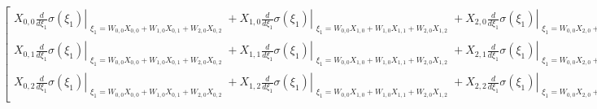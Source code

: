 \documentclass[11pt]{article}
\newcommand{\prompt}[4]{
        \ttfamily\llap{{\color{#2}[#3]:\hspace{3pt}#4}}\vspace{-\baselineskip}
    }
\begin{document}
\prompt{Out}{outcolor}{87}{}

    $\displaystyle \left[\begin{matrix}X_{0, 0} \left. \frac{d}{d \xi_{1}} \sigma{\left(\xi_{1} \right)} \right|_{\substack{ \xi_{1}=W_{0, 0} X_{0, 0} + W_{1, 0} X_{0, 1} + W_{2, 0} X_{0, 2} }} + X_{1, 0} \left. \frac{d}{d \xi_{1}} \sigma{\left(\xi_{1} \right)} \right|_{\substack{ \xi_{1}=W_{0, 0} X_{1, 0} + W_{1, 0} X_{1, 1} + W_{2, 0} X_{1, 2} }} + X_{2, 0} \left. \frac{d}{d \xi_{1}} \sigma{\left(\xi_{1} \right)} \right|_{\substack{ \xi_{1}=W_{0, 0} X_{2, 0} + W_{1, 0} X_{2, 1} + W_{2, 0} X_{2, 2} }} & X_{0, 0} \left. \frac{d}{d \xi_{1}} \sigma{\left(\xi_{1} \right)} \right|_{\substack{ \xi_{1}=W_{0, 1} X_{0, 0} + W_{1, 1} X_{0, 1} + W_{2, 1} X_{0, 2} }} + X_{1, 0} \left. \frac{d}{d \xi_{1}} \sigma{\left(\xi_{1} \right)} \right|_{\substack{ \xi_{1}=W_{0, 1} X_{1, 0} + W_{1, 1} X_{1, 1} + W_{2, 1} X_{1, 2} }} + X_{2, 0} \left. \frac{d}{d \xi_{1}} \sigma{\left(\xi_{1} \right)} \right|_{\substack{ \xi_{1}=W_{0, 1} X_{2, 0} + W_{1, 1} X_{2, 1} + W_{2, 1} X_{2, 2} }}\\X_{0, 1} \left. \frac{d}{d \xi_{1}} \sigma{\left(\xi_{1} \right)} \right|_{\substack{ \xi_{1}=W_{0, 0} X_{0, 0} + W_{1, 0} X_{0, 1} + W_{2, 0} X_{0, 2} }} + X_{1, 1} \left. \frac{d}{d \xi_{1}} \sigma{\left(\xi_{1} \right)} \right|_{\substack{ \xi_{1}=W_{0, 0} X_{1, 0} + W_{1, 0} X_{1, 1} + W_{2, 0} X_{1, 2} }} + X_{2, 1} \left. \frac{d}{d \xi_{1}} \sigma{\left(\xi_{1} \right)} \right|_{\substack{ \xi_{1}=W_{0, 0} X_{2, 0} + W_{1, 0} X_{2, 1} + W_{2, 0} X_{2, 2} }} & X_{0, 1} \left. \frac{d}{d \xi_{1}} \sigma{\left(\xi_{1} \right)} \right|_{\substack{ \xi_{1}=W_{0, 1} X_{0, 0} + W_{1, 1} X_{0, 1} + W_{2, 1} X_{0, 2} }} + X_{1, 1} \left. \frac{d}{d \xi_{1}} \sigma{\left(\xi_{1} \right)} \right|_{\substack{ \xi_{1}=W_{0, 1} X_{1, 0} + W_{1, 1} X_{1, 1} + W_{2, 1} X_{1, 2} }} + X_{2, 1} \left. \frac{d}{d \xi_{1}} \sigma{\left(\xi_{1} \right)} \right|_{\substack{ \xi_{1}=W_{0, 1} X_{2, 0} + W_{1, 1} X_{2, 1} + W_{2, 1} X_{2, 2} }}\\X_{0, 2} \left. \frac{d}{d \xi_{1}} \sigma{\left(\xi_{1} \right)} \right|_{\substack{ \xi_{1}=W_{0, 0} X_{0, 0} + W_{1, 0} X_{0, 1} + W_{2, 0} X_{0, 2} }} + X_{1, 2} \left. \frac{d}{d \xi_{1}} \sigma{\left(\xi_{1} \right)} \right|_{\substack{ \xi_{1}=W_{0, 0} X_{1, 0} + W_{1, 0} X_{1, 1} + W_{2, 0} X_{1, 2} }} + X_{2, 2} \left. \frac{d}{d \xi_{1}} \sigma{\left(\xi_{1} \right)} \right|_{\substack{ \xi_{1}=W_{0, 0} X_{2, 0} + W_{1, 0} X_{2, 1} + W_{2, 0} X_{2, 2} }} & X_{0, 2} \left. \frac{d}{d \xi_{1}} \sigma{\left(\xi_{1} \right)} \right|_{\substack{ \xi_{1}=W_{0, 1} X_{0, 0} + W_{1, 1} X_{0, 1} + W_{2, 1} X_{0, 2} }} + X_{1, 2} \left. \frac{d}{d \xi_{1}} \sigma{\left(\xi_{1} \right)} \right|_{\substack{ \xi_{1}=W_{0, 1} X_{1, 0} + W_{1, 1} X_{1, 1} + W_{2, 1} X_{1, 2} }} + X_{2, 2} \left. \frac{d}{d \xi_{1}} \sigma{\left(\xi_{1} \right)} \right|_{\substack{ \xi_{1}=W_{0, 1} X_{2, 0} + W_{1, 1} X_{2, 1} + W_{2, 1} X_{2, 2} }}\end{matrix}\right]$
\end{document}
